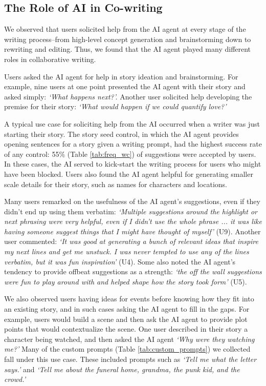 \subsection{The Role of AI in Co-writing}
\label{sec:results-idea-generator}

We observed that users solicited help from the AI agent at every stage of the writing process--from high-level concept generation and brainstorming down to rewriting and editing.
Thus, we found that the AI agent played many different roles in collaborative writing.

Users asked the AI agent for help in story ideation and brainstorming.
For example, nine users at one point presented the AI agent with their story and asked simply: \textit{`What happens next?'.}
Another user solicited help developing the premise for their story: \textit{`What would happen if we could quantify love?'} 

A typical use case for soliciting help from the AI occurred when a writer was just starting their story.
The story seed control, in which the AI agent provides opening sentences for a story given a writing prompt, had the highest success rate of any control: 55\% (Table \ref{tab:freq_wc}) of suggestions were accepted by users.
In these cases, the AI served to kick-start the writing process for users who might have been blocked.
Users also found the AI agent helpful for generating smaller scale details for their story, such as names for characters and locations.

Many users remarked on the usefulness of the AI agent's suggestions, even if they didn't end up using them verbatim: \textit{`Multiple suggestions around the highlight or next phrasing were very helpful, even if I didn't use the whole phrase ... it was like having someone suggest things that I might have thought of myself'} (U9).
Another user commented: \textit{`It was good at generating a bunch of relevant ideas that inspire my next lines and get me unstuck. I was never tempted to use any of the lines verbatim, but it was fun inspiration'} (U4).
Some also noted the AI agent's tendency to provide offbeat suggestions as a strength: \textit{`the off the wall suggestions were fun to play around with and helped shape how the story took form'} (U5).

We also observed users having ideas for events before knowing how they fit into an existing story, and in such cases asking the AI agent to fill in the gaps.
For example, users would build a scene and then ask the AI agent to provide plot points that would contextualize the scene. 
One user described in their story a character being watched, and then asked the AI agent \textit{`Why were they watching me?'}
Many of the custom prompts (Table \ref{tab:custom_prompts}) we collected fall under this use case. 
These included prompts such as \textit{`Tell me what the letter says.'} and \textit{`Tell me about the funeral home, grandma, the punk kid, and the crowd.'}

